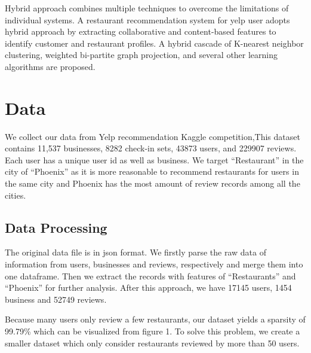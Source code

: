\documentclass{llncs}
\begin{document}
Hybrid approach combines multiple techniques to overcome the limitations of individual systems. A restaurant recommendation system for yelp user\cite{Sumedh} adopts hybrid approach by extracting collaborative and content-based features to identify customer and restaurant profiles. A hybrid cascade of K-nearest neighbor clustering, weighted bi-partite graph projection, and several other learning algorithms are proposed. 

\section{Data}
We collect our data from Yelp recommendation Kaggle competition\cite{yelp},This dataset contains 11,537 businesses, 8282 check-in sets, 43873 users, and 229907 reviews. Each user has a unique user id as well as business. We target “Restaurant” in the city of “Phoenix” as it is more reasonable to recommend restaurants for users in the same city and Phoenix has the most amount of review records among all the cities.
\subsection{ Data Processing}
The original data file is in json format. We firstly parse the raw data of information from users, businesses and reviews, respectively and merge them into one dataframe. Then we extract the records with features of “Restaurants” and “Phoenix” for further analysis. After this approach, we have 17145 users, 1454 business and 52749 reviews.

Because many users only review a few restaurants, our dataset yields a sparsity of 99.79\% which can be visualized from figure 1. To solve this problem, we create a smaller dataset which only consider  restaurants reviewed by more than 50 users.
%
\end{document}
